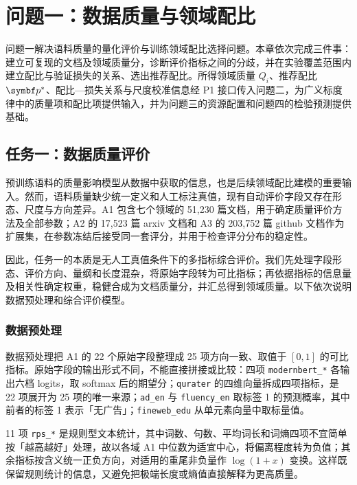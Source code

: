 \section{问题一：数据质量与领域配比}
\label{sec:q1}

问题一解决语料质量的量化评价与训练领域配比选择问题。本章依次完成三件事：建立可复现的文档及领域质量分，诊断评价指标之间的分歧，并在实验覆盖范围内建立配比与验证损失的关系、选出推荐配比。所得领域质量 $Q_i$、推荐配比 $\bp^*$、配比—损失关系与尺度校准信息经 P1 接口传入问题二，为广义标度律中的质量项和配比项提供输入，并为问题三的资源配置和问题四的检验预测提供基础。

\subsection{任务一：数据质量评价}
\label{sec:q1_task1}

预训练语料的质量影响模型从数据中获取的信息，也是后续领域配比建模的重要输入。然而，语料质量缺少统一定义和人工标注真值，现有自动评价字段又存在形态、尺度与方向差异。A1 包含七个领域的 51,230 篇文档，用于确定质量评价方法及全部参数；A2 的 17,523 篇 arxiv 文档和 A3 的 203,752 篇 github 文档作为扩展集，在参数冻结后接受同一套评分，并用于检查评分分布的稳定性。

因此，任务一的本质是无人工真值条件下的多指标综合评价。我们先处理字段形态、评价方向、量纲和长度混杂，将原始字段转为可比指标；再依据指标的信息量及相关性确定权重，稳健合成为文档质量分，并汇总得到领域质量。以下依次说明数据预处理和综合评价模型。

\subsubsection{数据预处理}
\label{sec:q1_preproc}

数据预处理把 A1 的 22 个原始字段整理成 25 项方向一致、取值于 $[0,1]$ 的可比指标。原始字段的输出形式不同，不能直接拼接或比较：四项 \texttt{modernbert\_*} 各输出六档 logits，取 softmax 后的期望分；\texttt{qurater} 的四维向量拆成四项指标，是 22 项展开为 25 项的唯一来源；\texttt{ad\_en} 与 \texttt{fluency\_en} 取标签 1 的预测概率，其中前者的标签 1 表示「无广告」；\texttt{fineweb\_edu} 从单元素向量中取标量值。

11 项 \texttt{rps\_*} 是规则型文本统计，其中词数、句数、平均词长和词熵四项不宜简单按「越高越好」处理，故以各域 A1 中位数为适宜中心，将偏离程度转为负值；其余指标按含义统一正负方向，对适用的重尾非负量作 $\log(1+x)$ 变换。这样既保留规则统计的信息，又避免把极端长度或熵值直接解释为更高质量。

